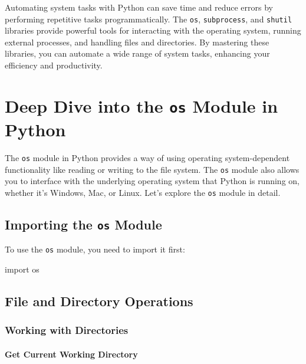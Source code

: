 \documentclass[
  letterpaper,
  DIV=11,
  numbers=noendperiod]{scrreprt}
\newenvironment{Shaded}{\begin{snugshade}}{\end{snugshade}}
\newcommand{\ImportTok}[1]{\textcolor[rgb]{0.00,0.46,0.62}{#1}}
\newcommand{\NormalTok}[1]{\textcolor[rgb]{0.00,0.23,0.31}{#1}}
\begin{document}
Automating system tasks with Python can save time and reduce errors by
performing repetitive tasks programmatically. The \texttt{os},
\texttt{subprocess}, and \texttt{shutil} libraries provide powerful
tools for interacting with the operating system, running external
processes, and handling files and directories. By mastering these
libraries, you can automate a wide range of system tasks, enhancing your
efficiency and productivity.


\chapter{\texorpdfstring{Deep Dive into the \texttt{os} Module in
Python}{Deep Dive into the os Module in Python}}\label{deep-dive-into-the-os-module-in-python}

The \texttt{os} module in Python provides a way of using operating
system-dependent functionality like reading or writing to the file
system. The \texttt{os} module also allows you to interface with the
underlying operating system that Python is running on, whether it's
Windows, Mac, or Linux. Let's explore the \texttt{os} module in detail.

\section{\texorpdfstring{Importing the \texttt{os}
Module}{Importing the os Module}}\label{importing-the-os-module}

To use the \texttt{os} module, you need to import it first:

\begin{Shaded}
\begin{Highlighting}[]
\ImportTok{import}\NormalTok{ os}
\end{Highlighting}
\end{Shaded}

\section{File and Directory
Operations}\label{file-and-directory-operations}

\subsection{Working with Directories}\label{working-with-directories-1}

\subsubsection{Get Current Working
Directory}\label{get-current-working-directory}
\end{document}
